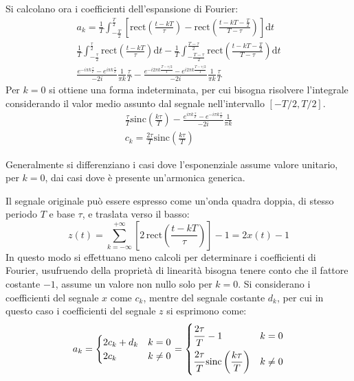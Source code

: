 \documentclass{article}
\newcommand{\rect}{\mathrm{rect}}
\newcommand{\sinc}{\mathrm{sinc}}
\newcommand{\df}{\mathrm{d}}
\numberwithin{equation}{subsection}
\begin{document}
Si calcolano ora i coefficienti dell'espansione di Fourier:
\begin{gather*}
    a_k=\displaystyle\frac{1}{T}\int_{-\frac{T}{2}}^{\frac{T}{2}}\left[\rect\left(\frac{t-kT}{\tau}\right)-\rect\left(\frac{t-kT-\frac{T}{2}}{T-\tau}\right)\right]\df t\\
    \displaystyle\frac{1}{T}\int_{-\frac{\tau}{2}}^{\frac{\tau}{2}}\rect\left(\frac{t-kT}{\tau}\right)\df t-\frac{1}{T}\int_{-\frac{T-\tau}{2}}^{\frac{T-\tau}{2}}\rect\left(\frac{t-kT-\frac{T}{2}}{T-\tau}\right)\df t\\
    \displaystyle\frac{e^{-i\pi k\frac{\tau}{T}}-e^{i\pi k\frac{\tau}{T}}}{-2i}\frac{1}{\pi k}\frac{\tau}{T}-\frac{e^{-i2\pi k\frac{T-\tau/2}{T}}-e^{i2\pi k\frac{T-\tau/2}{T}}}{-2i}\frac{1}{\pi k}\frac{\tau}{T}
\end{gather*}
Per $k=0$ si ottiene una forma indeterminata, per cui bisogna risolvere l'integrale considerando il valor medio assunto dal segnale nell'intervallo $\left[-T/2,T/2\right]$. 
\begin{gather*}
    \displaystyle\frac{\tau}{T}\sinc\left(\frac{k\tau}{T}\right)-\frac{e^{i\pi k\frac{\tau}{T}}-e^{-i\pi k\frac{\tau}{T}}}{-2i}\frac{1}{\pi k}\\
    c_k=\displaystyle\frac{2\tau}{T}\sinc\left(\frac{k\tau}{T}\right)
\end{gather*}


Generalmente si differenziano i casi dove l'esponenziale assume valore unitario, per $k=0$, dai casi dove è presente un'armonica generica. 

Il segnale originale può essere espresso come un'onda quadra doppia, di stesso periodo $T$ e base $\tau$, e traslata verso il basso:
\begin{equation*}
    z(t)=\displaystyle\sum_{k=-\infty}^{+\infty}\left[2\,\rect\left(\frac{t-kT}{\tau}\right)\right]-1=2x(t)-1
\end{equation*}
In questo modo si effettuano meno calcoli per determinare i coefficienti di Fourier, usufruendo della proprietà di linearità bisogna tenere conto che il fattore costante $-1$, 
assume un valore non nullo solo per $k=0$. Si considerano i coefficienti del segnale $x$ come $c_k$, mentre del segnale costante $d_k$, per cui in questo caso i coefficienti 
del segnale $z$ si esprimono come: 
\begin{equation*}
    a_k=\begin{cases}
        2c_k+d_k &k=0\\
        2c_k&k\neq0
    \end{cases}=\begin{cases}
        \displaystyle\frac{\strut 2\tau}{\strut T}-1&k=0\\
        \displaystyle\frac{\strut 2\tau}{\strut T}\sinc\left(\frac{ k\tau}{ T}\right)&k\neq0
    \end{cases}
\end{equation*}
\end{document}
